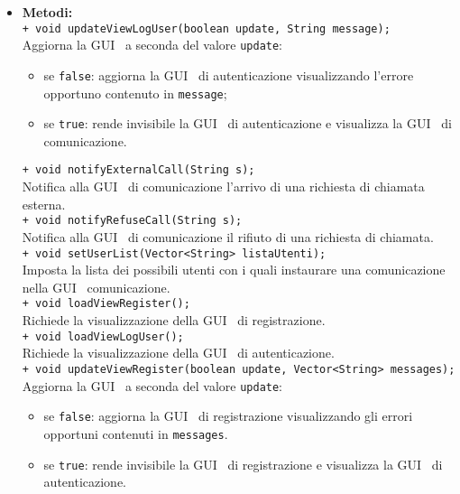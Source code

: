 {\begin{sloppypar}
{\begin{itemize}
\begin{itemize}
			\item[]  \textbf{Metodi:}\\
			\texttt{+ void updateViewLogUser(boolean update, String message);}\\
			Aggiorna la GUI\g~ a seconda del valore \texttt{update}:
			\begin{itemize}
				\item se \texttt{false}: aggiorna la GUI\g~ di autenticazione visualizzando l’errore opportuno contenuto in \texttt{message};
				\item se \texttt{true}: rende invisibile la GUI\g~ di autenticazione e visualizza la GUI\g~ di comunicazione.\\
			\end{itemize}
			
			\texttt{+ void notifyExternalCall(String s);}\\
			Notifica alla GUI\g~ di comunicazione l’arrivo di una richiesta di chiamata esterna.\\
			
			\texttt{+ void notifyRefuseCall(String s);}\\
			Notifica alla GUI\g~ di comunicazione il rifiuto di una richiesta di chiamata.\\
			
			\texttt{+ void setUserList(Vector<String> listaUtenti);}\\
			Imposta la lista dei possibili utenti con i quali instaurare una comunicazione nella GUI\g~ comunicazione.\\

			\texttt{+ void loadViewRegister();}\\
			Richiede la visualizzazione della GUI\g~ di registrazione.\\

			\texttt{+ void loadViewLogUser();}\\
			Richiede  la visualizzazione della GUI\g~ di autenticazione.\\

			\texttt{+ void updateViewRegister(boolean update, Vector<String> messages);}\\
			Aggiorna la GUI\g~ a seconda del valore \texttt{update}:
			\begin{itemize}
				\item se \texttt{false}: aggiorna la GUI\g~ di registrazione visualizzando gli errori opportuni contenuti in \texttt{messages}.
				\item se \texttt{true}: rende invisibile la GUI\g~ di registrazione e visualizza la GUI\g~ di autenticazione.\\
			\end{itemize}


\end{itemize}
\end{itemize}}
\end{sloppypar}}
